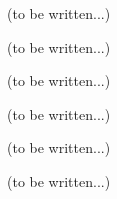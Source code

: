 (to be written...)







(to be written...)



(to be written...)







(to be written...)






(to be written...)



(to be written...)

\begin{appendices}
\end{appendices}

